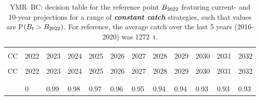 \documentclass[11pt]{book}
\newcommand{\itbf}[1]{\textit{\textbf{#1}}}
\begin{document}
\begin{longtable}[c]{>{\raggedright\let\newline\\\arraybackslash\hspace{0pt}}p{0.5in}>{\raggedleft\let\newline\\\arraybackslash\hspace{0pt}}p{0.5in}>{\raggedleft\let\newline\\\arraybackslash\hspace{0pt}}p{0.5in}>{\raggedleft\let\newline\\\arraybackslash\hspace{0pt}}p{0.5in}>{\raggedleft\let\newline\\\arraybackslash\hspace{0pt}}p{0.5in}>{\raggedleft\let\newline\\\arraybackslash\hspace{0pt}}p{0.5in}>{\raggedleft\let\newline\\\arraybackslash\hspace{0pt}}p{0.5in}>{\raggedleft\let\newline\\\arraybackslash\hspace{0pt}}p{0.5in}>{\raggedleft\let\newline\\\arraybackslash\hspace{0pt}}p{0.5in}>{\raggedleft\let\newline\\\arraybackslash\hspace{0pt}}p{0.5in}>{\raggedleft\let\newline\\\arraybackslash\hspace{0pt}}p{0.5in}>{\raggedleft\let\newline\\\arraybackslash\hspace{0pt}}p{0.5in}}
  \caption{YMR~BC: decision table for the reference point $B_{2022}$ featuring current- and 10-year projections for a range of \itbf{constant catch} strategies, such that values are P$(B_t > B_{2022})$.  For reference, the average catch over the last 5 years (2016-2020) was 1272~t. } \label{tab:ymr.gmu.Bcurr.CCs}\\  \hline\\[-2.2ex]  CC  & 2022 & 2023 & 2024 & 2025 & 2026 & 2027 & 2028 & 2029 & 2030 & 2031 & 2032 \\[0.2ex]\hline\\[-1.5ex]  \endfirsthead   \hline  CC  & 2022 & 2023 & 2024 & 2025 & 2026 & 2027 & 2028 & 2029 & 2030 & 2031 & 2032 \\[0.2ex]\hline\\[-1.5ex]  \endhead  \hline\\[-2.2ex]   \endfoot  \hline \endlastfoot  0 & 0 & 0.99 & 0.98 & 0.97 & 0.96 & 0.95 & 0.94 & 0.94 & 0.93 & 0.93 & 0.93 \\ 

\end{longtable}
\end{document}

